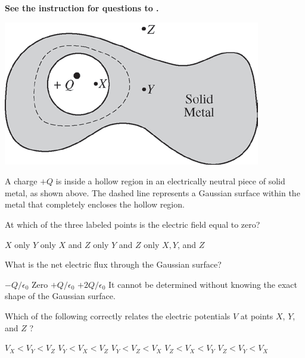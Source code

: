\textbf{See the instruction for questions  to .}

\begin{center}
\includegraphics[scale=0.5]{images/img-003-006.png}
\end{center}

A charge $+Q$ is inside a hollow region in an electrically neutral piece of solid metal, as shown above. The dashed line represents a Gaussian surface within the metal that completely encloses the hollow region.

\begin{questions}\setcounter{question}{7}\question
At which of the three labeled points is the electric field equal to zero?

\begin{oneparchoices}
\choice $X$ only
\choice $Y$ only
\choice $X$ and $Z$ only
\choice $Y$ and $Z$ only
\choice $X, Y$, and $Z$
\end{oneparchoices}\end{questions}

\begin{questions}\setcounter{question}{8}\question
What is the net electric flux through the Gaussian surface?

\begin{choices}
\choice $-Q / \epsilon_{0}$
\choice Zero
\choice $+Q / \epsilon_{0}$
\choice $+2 Q / \epsilon_{0}$
\choice It cannot be determined without knowing the exact shape of the Gaussian surface.
\end{choices}\end{questions}

\begin{questions}\setcounter{question}{9}\question
Which of the following correctly relates the electric potentials $V$ at points $X$, $Y$, and $Z$ ?

\begin{choices}
\choice $V_{X}<V_{Y}<V_{Z}$
\choice $V_{Y}<V_{X}<V_{Z} $
\choice $V_{Y}<V_{Z}<V_{X}$
\choice $V_{Z}<V_{X}<V_{Y}$
\choice $V_{Z}<V_{Y}<V_{X}$
\end{choices}\end{questions}

